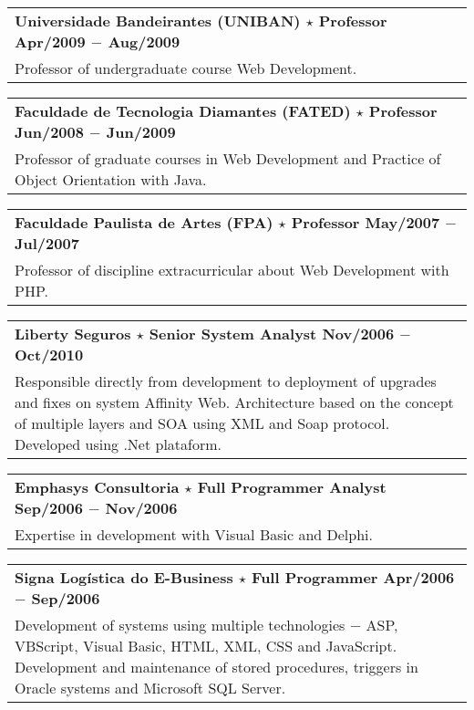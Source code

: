 \documentclass[a4paper, oneside, final]{scrartcl}
\newcommand{\vspc}{\vspace{0.15cm}} %
\begin{document}
\begin{center}
\begin{tabularx}{1\linewidth}{X}
{\bf Universidade Bandeirantes (UNIBAN) $\star$ Professor \hfill Apr/2009 $-$ Aug/2009} \\
Professor of undergraduate course Web Development. \vspc\\
\end{tabularx}

\begin{tabularx}{1\linewidth}{X}
{\bf Faculdade de Tecnologia Diamantes (FATED) $\star$ Professor \hfill Jun/2008 $-$ Jun/2009} \\
Professor of graduate courses in Web Development and Practice of Object Orientation with Java. \vspc\\
\end{tabularx}

\begin{tabularx}{1\linewidth}{X}
{\bf Faculdade Paulista de Artes (FPA) $\star$ Professor  \hfill May/2007 $-$ Jul/2007} \\
Professor of discipline extracurricular about Web Development with PHP. \vspc\\
\end{tabularx}

\begin{tabularx}{1\linewidth}{X}
{\bf Liberty Seguros $\star$ Senior System Analyst \hfill Nov/2006 $-$ Oct/2010} \\
Responsible directly from development to deployment of upgrades and fixes on system Affinity Web. Architecture based on the concept of multiple layers and SOA using XML and Soap protocol. Developed using .Net plataform.\vspc\\
\end{tabularx}

\begin{tabularx}{1\linewidth}{X}
{\bf Emphasys Consultoria $\star$ Full Programmer Analyst \hfill Sep/2006 $-$ Nov/2006} \\
Expertise in development with Visual Basic and Delphi. \vspc\\
\end{tabularx}

\begin{tabularx}{1\linewidth}{X}
{\bf Signa Logística do E-Business $\star$ Full Programmer \hfill Apr/2006 $-$ Sep/2006} \\
Development of systems using multiple technologies $-$ ASP, VBScript, Visual Basic, HTML, XML, CSS and JavaScript. Development and maintenance of stored procedures, triggers in Oracle systems and Microsoft SQL Server. \vspc\\
\end{tabularx}


\end{center}
\end{document}
